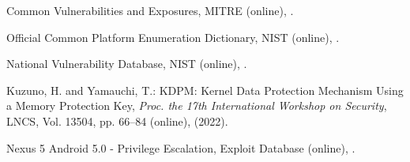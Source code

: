 \documentclass[english,sigrecommended,JIP]{ipsj}
\begin{document}




















\begin{thebibliography}{99}


    Common Vulnerabilities and Exposures, MITRE (online),
      .
    
    Official Common Platform Enumeration Dictionary, NIST (online), 
      .    


    National Vulnerability Database, NIST (online),
     .    

  
    Kuzuno, H. and Yamauchi, T.: KDPM: Kernel Data Protection Mechanism Using a Memory Protection Key,
    \textit{Proc. the 17th International Workshop on Security}, LNCS, Vol. 13504, pp. 66--84 (online),
     (2022).    

  Nexus 5 Android 5.0 - Privilege Escalation, Exploit Database (online),  . %



\end{thebibliography}
\end{document}

